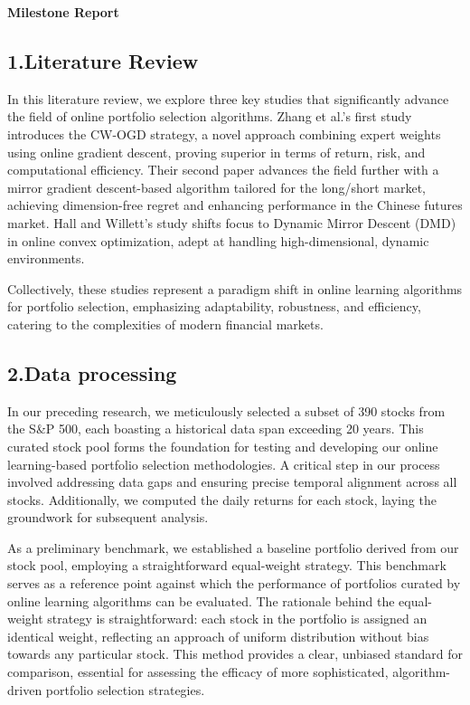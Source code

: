 \documentclass[]{report}
\begin{document}
\begin{center}
    \Large \textbf{Milestone Report}
\end{center}

\subsection*{1.Literature Review}


In this literature review, we explore three key studies that significantly advance the field of online portfolio selection algorithms. Zhang et al.\cite*{zhang2021combining}'s first study introduces the CW-OGD strategy, a novel approach combining expert weights using online gradient descent, proving superior in terms of return, risk, and computational efficiency. Their second paper\cite*{zhang2023effective} advances the field further with a mirror gradient descent-based algorithm tailored for the long/short market, achieving dimension-free regret and enhancing performance in the Chinese futures market. Hall and Willett's\cite*{hall2015online} study shifts focus to Dynamic Mirror Descent (DMD) in online convex optimization, adept at handling high-dimensional, dynamic environments. 

Collectively, these studies represent a paradigm shift in online learning algorithms for portfolio selection, emphasizing adaptability, robustness, and efficiency, catering to the complexities of modern financial markets.

\subsection*{2.Data processing}

In our preceding research, we meticulously selected a subset of 390 stocks from the S\&P 500, each boasting a historical data span exceeding 20 years. This curated stock pool forms the foundation for testing and developing our online learning-based portfolio selection methodologies. A critical step in our process involved addressing data gaps and ensuring precise temporal alignment across all stocks. Additionally, we computed the daily returns for each stock, laying the groundwork for subsequent analysis.

As a preliminary benchmark, we established a baseline portfolio derived from our stock pool, employing a straightforward equal-weight strategy. This benchmark serves as a reference point against which the performance of portfolios curated by online learning algorithms can be evaluated. The rationale behind the equal-weight strategy is straightforward: each stock in the portfolio is assigned an identical weight, reflecting an approach of uniform distribution without bias towards any particular stock. This method provides a clear, unbiased standard for comparison, essential for assessing the efficacy of more sophisticated, algorithm-driven portfolio selection strategies.
\end{document}
